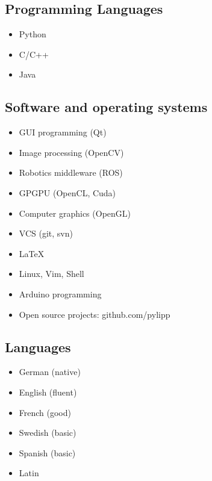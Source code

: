 \documentclass[a4paper,10pt]{memoir}
\begin{document}
\subsection*{Programming Languages}
\vspace*{-\baselineskip}
\begin{multicols}{3}
  \begin{itemize}
    \item Python
    \item C/C++
    \item Java 
  \end{itemize}
\end{multicols}

\subsection*{Software and operating systems}
\vspace*{-\baselineskip}
\begin{multicols}{2}
\begin{itemize}
  \item GUI programming (Qt)
  \item Image processing (OpenCV)
  \item Robotics middleware (ROS)
  \item GPGPU (OpenCL, Cuda)
  \item Computer graphics (OpenGL)
  \item VCS (git, svn)
  \item \LaTeX
  \item Linux, Vim, Shell
  \item Arduino programming
  \item Open source projects: github.com/pylipp
\end{itemize}
\end{multicols}

\subsection*{Languages}
\vspace*{-\baselineskip}
\begin{multicols}{3}
  \begin{itemize}
    \item German (native)
    \item English (fluent)
    \item French (good)
    \item Swedish (basic)
    \item Spanish (basic)
    \item Latin
  \end{itemize}
\end{multicols}
\end{document}
